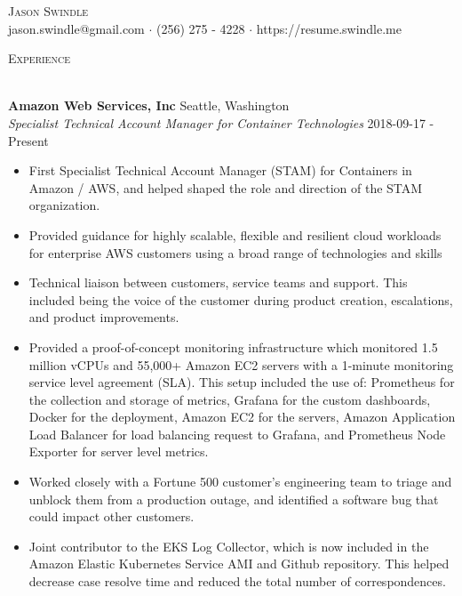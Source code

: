 \documentclass[a4paper]{article}
\newcommand{\lineunder} {
    \vspace*{-8pt} \\
    \hspace*{-18pt} \hrulefill \\
}
\newcommand{\header} [1] {
    {\hspace*{-18pt}\vspace*{6pt} \textsc{#1}}
    \vspace*{-6pt} \lineunder
}
\begin{document}
\vspace*{-40pt}

\vspace*{-10pt}
\begin{center}
    {\Huge \scshape {Jason Swindle}}\\[1\baselineskip]
    jason.swindle@gmail.com $\cdot$ (256) 275 - 4228 $\cdot$ https://resume.swindle.me\\[1\baselineskip]
\end{center}

\header{Experience}
\vspace{1mm}

\textbf{Amazon Web Services, Inc} \hfill Seattle, Washington\\
\textit{Specialist Technical Account Manager for Container Technologies} \hfill 2018-09-17 - Present\\
\vspace{-1mm}
\begin{itemize} \itemsep 1pt
    \item First Specialist Technical Account Manager (STAM) for Containers in Amazon / AWS, and helped shaped the role and direction of the STAM organization.
    \item Provided guidance for highly scalable, flexible and resilient cloud workloads for enterprise AWS customers using a broad range of technologies and skills
    \item Technical liaison between customers, service teams and support. This included being the voice of the customer during product creation, escalations, and product improvements.
    \item Provided a proof-of-concept monitoring infrastructure which monitored 1.5 million vCPUs and 55,000+ Amazon EC2 servers with a 1-minute monitoring service level agreement (SLA). This setup included the use of: Prometheus for the collection and storage of metrics, Grafana for the custom dashboards, Docker for the deployment, Amazon EC2 for the servers, Amazon Application Load Balancer for load balancing request to Grafana, and Prometheus Node Exporter for server level metrics.
    \item Worked closely with a Fortune 500 customer's engineering team to triage and unblock them from a production outage, and identified a software bug that could impact other customers.
    \item Joint contributor to the \textquotedbl{}EKS Log Collector\textquotedbl{}, which is now included in the Amazon Elastic Kubernetes Service AMI and Github repository. This helped decrease case resolve time and reduced the total number of correspondences.
\end{itemize}
\end{document}
